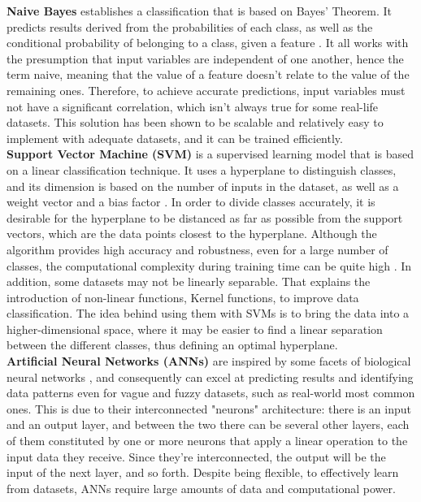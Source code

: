 \textbf{Naive Bayes} establishes a classification that is based on Bayes' Theorem. It predicts results derived from the probabilities of each class, as well as the conditional probability of belonging to a class, given a feature \cite{naivebayes}. It all works with the presumption that input variables are independent of one another, hence the term naive, meaning that the value of a feature doesn't relate to the value of the remaining ones. Therefore, to achieve accurate predictions, input variables must not have a significant correlation, which isn't always true for some real-life datasets. This solution has been shown to be scalable and relatively easy to implement with adequate datasets, and it can be trained efficiently.\\

\textbf{Support Vector Machine (SVM)} is a supervised learning model that is based on a linear classification technique. It uses a hyperplane to distinguish classes, and its dimension is based on the number of inputs in the dataset, as well as a weight vector and a bias factor \cite{svm}. In order to divide classes accurately, it is desirable for the hyperplane to be distanced as far as possible from the support vectors, which are the data points closest to the hyperplane. 
Although the algorithm provides high accuracy and robustness, even for a large number of classes, the computational complexity during training time can be quite high \cite{svm2}. In addition,  some datasets may not be linearly separable. That explains the introduction of non-linear functions, Kernel functions, to improve data classification. The idea behind using them with \glspl{SVM} is to bring the data into a higher-dimensional space, where it may be easier to find a linear separation between the different classes, thus defining an optimal hyperplane.\\

\textbf{Artificial Neural Networks (ANNs)} are inspired by some facets of biological neural networks \cite{anns}, and consequently can excel at predicting results and identifying data patterns even for vague and fuzzy datasets, such as real-world most common ones. This is due to their interconnected "neurons" architecture: there is an input and an output layer, and between the two there can be several other layers, each of them constituted by one or more neurons that apply a linear operation to the input data they receive. Since they're interconnected, the output will be the input of the next layer, and so forth. Despite being flexible, to effectively learn from datasets, \glspl{ANN} require large amounts of data and computational power.


